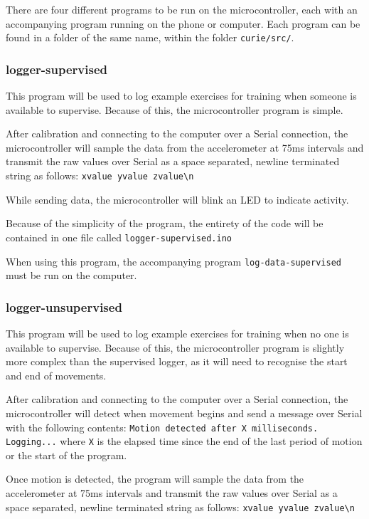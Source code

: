 \documentclass[a4paper]{article}
\begin{document}
There are four different programs to be run on the microcontroller, each with an accompanying program running on the phone or computer. Each program can be found in a folder of the same name, within the folder \lstinline{curie/src/}.

\subsubsection{logger-supervised}

This program will be used to log example exercises for training when someone is available to supervise. Because of this, the microcontroller program is simple.

After calibration and connecting to the computer over a Serial connection, the microcontroller will sample the data from the accelerometer at 75ms intervals and transmit the raw values over Serial as a space separated, newline terminated string as follows:
\lstinline|xvalue yvalue zvalue\n|

While sending data, the microcontroller will blink an LED to indicate activity.

Because of the simplicity of the program, the entirety of the code will be contained in one file called \lstinline{logger-supervised.ino}

When using this program, the accompanying program \lstinline{log-data-supervised} must be run on the computer.

\subsubsection{logger-unsupervised}

This program will be used to log example exercises for training when no one is available to supervise. Because of this, the microcontroller program is slightly more complex than the supervised logger, as it will need to recognise the start and end of movements.

After calibration and connecting to the computer over a Serial connection, the microcontroller will detect when movement begins and send a message over Serial with the following contents: \lstinline{Motion detected after X milliseconds. Logging...} where \lstinline{X} is the elapsed time since the end of the last period of motion or the start of the program.

Once motion is detected, the program will sample the data from the accelerometer at 75ms intervals and transmit the raw values over Serial as a space separated, newline terminated string as follows:
\lstinline|xvalue yvalue zvalue\n|
\end{document}
